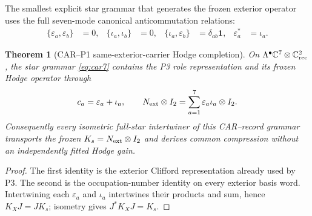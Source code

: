 \documentclass[11pt,a4paper]{article}
\newtheorem{theorem}[definition]{Theorem}
\theoremstyle{remark}
\newcommand{\id}{\mathbf 1}
\begin{document}
The smallest explicit star grammar that generates the frozen exterior
operator uses the full seven-mode canonical anticommutation relations:
\begin{align}
 \{\varepsilon_a,\varepsilon_b\}&=0,&
 \{\iota_a,\iota_b\}&=0,&
 \{\iota_a,\varepsilon_b\}&=\delta_{ab}\id,&
 \varepsilon_a^*&=\iota_a.
 \label{eq:car7}
\end{align}

\begin{theorem}[CAR--P1 same-exterior-carrier Hodge completion]
On $\Lambda^\bullet\mathbb C^7\otimes\mathbb C^2_{\rm rec}$, the star
grammar \eqref{eq:car7} contains the P3 role representation and its frozen
Hodge operator through
\begin{equation}
 c_a=\varepsilon_a+\iota_a,
 \qquad
 N_{\rm ext}\otimes I_2
 =\sum_{a=1}^{7}\varepsilon_a\iota_a\otimes I_2.
 \label{eq:carrecovery}
\end{equation}
Consequently every isometric full-star intertwiner of this CAR--record
grammar transports the frozen $K_s=N_{\rm ext}\otimes I_2$ and derives
common compression without an independently fitted Hodge gain.
\end{theorem}

\begin{proof}
The first identity is the exterior Clifford representation already used by
P3.  The second is the occupation-number identity on every exterior basis
word.  Intertwining each $\varepsilon_a$ and $\iota_a$ intertwines their
products and sum, hence $K_XJ=JK_s$; isometry gives
$J^*K_XJ=K_s$.
\end{proof}
\end{document}
